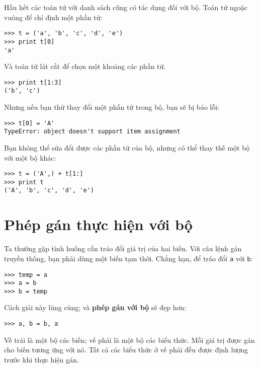 \documentclass[11pt]{book}
\begin{document}
Hầu hết các toán tử với danh sách cũng có tác dụng đối với bộ. Toán tử
ngoặc vuông để chỉ định một phần tử:


\beforeverb
\begin{verbatim}
>>> t = ('a', 'b', 'c', 'd', 'e')
>>> print t[0]
'a'
\end{verbatim}
\afterverb
%
Và toán tử lát cắt để chọn một khoảng các phần tử.


\beforeverb
\begin{verbatim}
>>> print t[1:3]
('b', 'c')
\end{verbatim}
\afterverb
%
Nhưng nếu bạn thử thay đổi một phần tử trong bộ, bạn sẽ bị báo lỗi:


\beforeverb
\begin{verbatim}
>>> t[0] = 'A'
TypeError: object doesn't support item assignment
\end{verbatim}
\afterverb
%
Bạn không thể sửa đổi được các phần tử của bộ, nhưng có thể thay thế
một bộ với một bộ khác:

\beforeverb
\begin{verbatim}
>>> t = ('A',) + t[1:]
>>> print t
('A', 'b', 'c', 'd', 'e')
\end{verbatim}
\afterverb
%

\section{Phép gán thực hiện với bộ}
\label{tuple assignment}


Ta thường gặp tình huống cần tráo đổi giá trị của hai biến.
Với câu lệnh gán truyền thống, bạn phải dùng một biến tạm thời.
Chẳng hạn, để tráo đổi {\tt a} với {\tt b}:

\beforeverb
\begin{verbatim}
>>> temp = a
>>> a = b
>>> b = temp
\end{verbatim}
\afterverb
%
Cách giải này lủng củng; và {\bf phép gán với bộ} sẽ đẹp hơn:

\beforeverb
\begin{verbatim}
>>> a, b = b, a
\end{verbatim}
\afterverb
%
Vế trái là một bộ các biến; vế phải là một bộ các biểu thức.
Mỗi giá trị được gán cho biến tương ứng với nó. Tất cả các 
biểu thức ở vế phải đều được định lượng trước khi thực hiện
gán.
\end{document}
